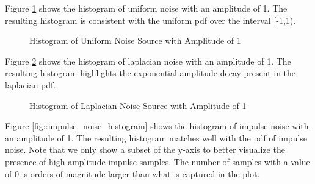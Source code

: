 \documentclass{article}
\begin{document}
Figure \ref{fig::uniform_noise_histogram} shows the histogram of uniform noise with an amplitude of 1. The resulting histogram is consistent with the uniform pdf over the interval [-1,1).

\begin{figure}[H]
	\centerline{}
	\caption{Histogram of Uniform Noise Source with Amplitude of 1}
	\label{fig::uniform_noise_histogram}
\end{figure}

Figure \ref{fig::laplacian_noise_histogram} shows the histogram of laplacian noise with an amplitude of 1. The resulting histogram highlights the exponential amplitude decay present in the laplacian pdf.

\begin{figure}[H]
	\centerline{}
	\caption{Histogram of Laplacian Noise Source with Amplitude of 1}
	\label{fig::laplacian_noise_histogram}
\end{figure}

Figure \ref{fig::impulse_noise_histogram} shows the histogram of impulse noise with an amplitude of 1. The resulting histogram matches well with the pdf of impulse noise. Note that we only show a subset of the y-axis to better visualize the presence of high-amplitude impulse samples. The number of samples with a value of 0 is orders of magnitude larger than what is captured in the plot. 
\end{document}
